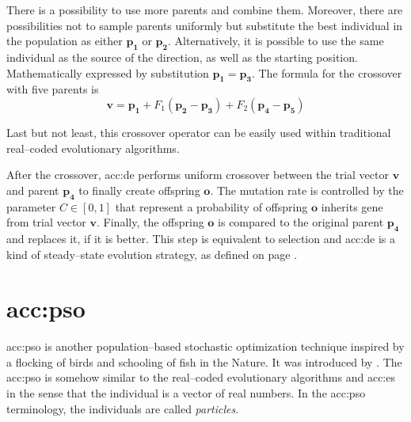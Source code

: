 There is a possibility to use more parents and combine them. Moreover, there are possibilities not to sample parents uniformly but substitute the best individual in the population as either $\mathbf{p_1}$ or $\mathbf{p_2}$. Alternatively, it is possible to use the same individual as the source of the direction, as well as the starting position. Mathematically expressed by substitution $\mathbf{p_1} = \mathbf{p_3}$. The formula for the crossover with five parents is
$$
\mathbf{v} = \mathbf{p_1} + F_1\left( \mathbf{p_2} - \mathbf{p_3} \right) + F_2\left( \mathbf{p_4} - \mathbf{p_5} \right)
$$

Last but not least, this crossover operator can be easily used within traditional real--coded evolutionary algorithms.

After the crossover, \acrshort{acc:de} performs uniform crossover between the trial vector $\mathbf{v}$ and parent $\mathbf{p_4}$ to finally create offspring $\mathbf{o}$. The mutation rate is controlled by the parameter $C\in\left[0,1\right]$ that represent a probability of offspring $\mathbf{o}$ inherits gene from trial vector $\mathbf{v}$. Finally, the offspring $\mathbf{o}$ is compared to the original parent $\mathbf{p_4}$ and replaces it, if it is better. This step is equivalent to selection and \acrshort{acc:de} is a kind of steady--state evolution strategy, as defined on page \pageref{enum:steadystate}.




\section{\texorpdfstring{\acrlong*{acc:pso}}{Particle Swarm Optimization}}

\acrfull{acc:pso} is another population--based stochastic optimization technique inspired by a flocking of birds and schooling of fish in the Nature. It was introduced by \citet*{PSOOriginal}. The \acrshort{acc:pso} is somehow similar to the real--coded evolutionary algorithms and \acrshort{acc:es} in the sense that the individual is a vector of real numbers. In the \acrshort{acc:pso} terminology, the individuals are called \emph{particles}.

